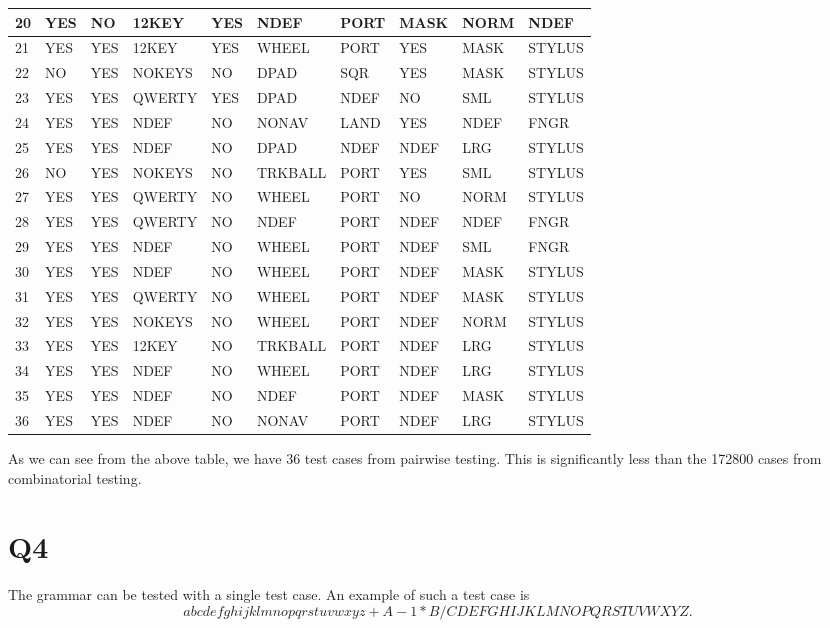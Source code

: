 \documentclass[12pt, letterpaper, titlepage]{article}
\begin{document}
\begin{tabularx}{\textwidth}{|X|X|X|X|X|X|X|X|X|X|}
    20 & YES & NO & 12KEY & YES & NDEF & PORT & MASK & NORM & NDEF \\ \hline
    21 & YES & YES & 12KEY & YES & WHEEL & PORT & YES & MASK & STYLUS \\ \hline
    22 & NO & YES & NOKEYS & NO & DPAD & SQR & YES & MASK & STYLUS \\ \hline
    23 & YES & YES & QWERTY & YES & DPAD & NDEF & NO & SML & STYLUS \\ \hline
    24 & YES & YES & NDEF & NO & NONAV & LAND & YES & NDEF & FNGR \\ \hline
    25 & YES & YES & NDEF & NO & DPAD & NDEF & NDEF & LRG & STYLUS \\ \hline
    26 & NO & YES & NOKEYS & NO & TRKBALL & PORT & YES & SML & STYLUS \\ \hline
    27 & YES & YES & QWERTY & NO & WHEEL & PORT & NO & NORM & STYLUS \\ \hline
    28 & YES & YES & QWERTY & NO & NDEF & PORT & NDEF & NDEF & FNGR \\ \hline
    29 & YES & YES & NDEF & NO & WHEEL & PORT & NDEF & SML & FNGR \\ \hline
    30 & YES & YES & NDEF & NO & WHEEL & PORT & NDEF & MASK & STYLUS \\ \hline
    31 & YES & YES & QWERTY & NO & WHEEL & PORT & NDEF & MASK & STYLUS \\ \hline
    32 & YES & YES & NOKEYS & NO & WHEEL & PORT & NDEF & NORM & STYLUS \\ \hline
    33 & YES & YES & 12KEY & NO & TRKBALL & PORT & NDEF & LRG & STYLUS \\ \hline
    34 & YES & YES & NDEF & NO & WHEEL & PORT & NDEF & LRG & STYLUS \\ \hline
    35 & YES & YES & NDEF & NO & NDEF & PORT & NDEF & MASK & STYLUS \\ \hline
    36 & YES & YES & NDEF & NO & NONAV & PORT & NDEF & LRG & STYLUS \\ \hline
\end{tabularx}
\normalsize

As we can see from the above table, we have 36 test cases from pairwise testing. This is significantly less than the 172800 cases from combinatorial testing.

\section*{Q4}
The grammar can be tested with a single test case. An example of such a test case is
\begin{equation}
    abcdefghijklmnopqrstuvwxyz + A - 1 * B / CDEFGHIJKLMNOPQRSTUVWXYZ. 
\end{equation}
\end{document}
